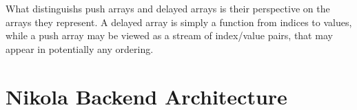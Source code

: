What distinguishs push arrays and delayed arrays is their perspective on the
arrays they represent. A delayed array is simply a function from indices to
values, while a push array may be viewed as a stream of index/value pairs, that
may appear in potentially any ordering.



\section{Nikola Backend Architecture}

